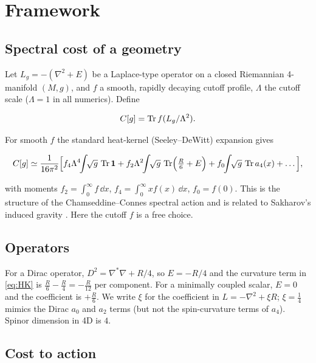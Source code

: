 \documentclass[11pt]{article}
\begin{document}
\section{Framework}
\label{sec:framework}

\subsection{Spectral cost of a geometry}

Let $L_g=-(\nabla^2+E)$ be a Laplace-type operator on a closed Riemannian 4-manifold $(M,g)$,
and $f$ a smooth, rapidly decaying cutoff profile, $\Lambda$ the cutoff scale ($\Lambda=1$ in
all numerics). Define

\begin{equation}
C[g]=\Tr f(L_g/\Lambda^2).
\end{equation}

For smooth $f$ the standard heat-kernel (Seeley--DeWitt) expansion gives \cite{gilkey1995invariance,vassilevich2003heat}

\begin{equation}
C[g]\simeq\frac{1}{16\pi^2}\Big[f_4\Lambda^4\!\!\int\!\!\sqrt g\,\Tr\mathbf 1
+f_2\Lambda^2\!\!\int\!\!\sqrt g\,\Tr\!\Big(\tfrac R6+E\Big)
+f_0\!\!\int\!\!\sqrt g\,\Tr a_4(x)+\dots\Big],
\label{eq:HK}
\end{equation}

with moments $f_2=\int_0^\infty f\,\dd x$, $f_4=\int_0^\infty x f(x)\,\dd x$, $f_0=f(0)$.
This is the structure of the Chamseddine--Connes spectral action \cite{chamseddine1997spectral} and is related to
Sakharov's induced gravity \cite{sakharov1967vacuum}. Here the cutoff $f$ is a free choice.

\subsection{Operators}

For a Dirac operator, $D^2=\nabla^*\nabla+R/4$, so $E=-R/4$ and the curvature term in
\eqref{eq:HK} is $\tfrac R6-\tfrac R4=-\tfrac R{12}$ per component. For a minimally coupled
scalar, $E=0$ and the coefficient is $+\tfrac R6$. We write $\xi$ for the coefficient in
$L=-\nabla^2+\xi R$; $\xi=\tfrac14$ mimics the Dirac $a_0$ and $a_2$ terms (but not the spin-curvature
terms of $a_4$). Spinor dimension in 4D is $4$.

\subsection{Cost to action}
\end{document}
